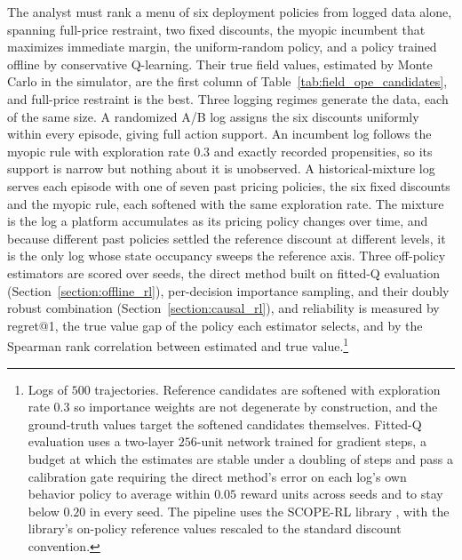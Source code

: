 The analyst must rank a menu of six deployment policies from logged data alone, spanning full-price restraint, two fixed discounts, the myopic incumbent that maximizes immediate margin, the uniform-random policy, and a policy trained offline by conservative Q-learning. Their true field values, estimated by Monte Carlo in the simulator, are the first column of Table~\ref{tab:field_ope_candidates}, and full-price restraint is the best. Three logging regimes generate the data, each of the same size. A randomized A/B log assigns the six discounts uniformly within every episode, giving full action support. An incumbent log follows the myopic rule with exploration rate $0.3$ and exactly recorded propensities, so its support is narrow but nothing about it is unobserved. A historical-mixture log serves each episode with one of seven past pricing policies, the six fixed discounts and the myopic rule, each softened with the same exploration rate. The mixture is the log a platform accumulates as its pricing policy changes over time, and because different past policies settled the reference discount at different levels, it is the only log whose state occupancy sweeps the reference axis. Three off-policy estimators are scored over \fieldopeseeds{} seeds, the direct method built on fitted-Q evaluation (Section~\ref{section:offline_rl}), per-decision importance sampling, and their doubly robust combination (Section~\ref{section:causal_rl}), and reliability is measured by regret@1, the true value gap of the policy each estimator selects, and by the Spearman rank correlation between estimated and true value.\footnote{Logs of $500$ trajectories. Reference candidates are softened with exploration rate $0.3$ so importance weights are not degenerate by construction, and the ground-truth values target the softened candidates themselves. Fitted-Q evaluation uses a two-layer $256$-unit network trained for \fieldopefqesteps{} gradient steps, a budget at which the estimates are stable under a doubling of steps and pass a calibration gate requiring the direct method's error on each log's own behavior policy to average within $0.05$ reward units across seeds and to stay below $0.20$ in every seed. The pipeline uses the SCOPE-RL library \citep{kiyohara2023scope}, with the library's on-policy reference values rescaled to the standard discount convention.}

